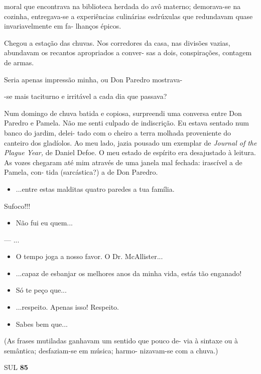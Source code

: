 moral que encontrava na biblioteca herdada do avô materno; demorava-se
na cozinha, entregava-se a experiências culinárias esdrúxulas que
redundavam quase invariavelmente em fa- lhanços épicos.

Chegou a estação das chuvas. Nos corredores da casa, nas divisões
vazias, abundavam os recantos apropriados a conver- sas a dois,
conspirações, contagem de armas.

Seria apenas impressão minha, ou Don Paredro mostrava-

-se mais taciturno e irritável a cada dia que passava?

Num domingo de chuva batida e copiosa, surpreendi uma conversa entre Don
Paredro e Pamela. Não me senti culpado de indiscrição. Eu estava sentado
num banco do jardim, delei- tado com o cheiro a terra molhada
proveniente do canteiro dos gladíolos. Ao meu lado, jazia pousado um
exemplar de \emph{Journal of the Plague Year, }de Daniel Defoe. O meu
estado de espírito era desajustado à leitura. As vozes chegaram até mim
através de uma janela mal fechada: irascível a de Pamela, con- tida
(sarcástica?) a de Don Paredro.

\begin{itemize}
\tightlist
\item
  ...entre estas malditas quatro paredes a tua família.
\end{itemize}

Sufoco!!!

\begin{itemize}
\tightlist
\item
  Não fui eu quem...
\end{itemize}

--- ...

\begin{itemize}
\tightlist
\item
  O tempo joga a nosso favor. O Dr. McAllister...
\item
  ...capaz de esbanjar os melhores anos da minha vida, estás tão
  enganado!
\item
  Só te peço que...
\item
  ...respeito. Apenas isso! Respeito.
\item
  Sabes bem que...
\end{itemize}

(As frases mutiladas ganhavam um sentido que pouco de- via à sintaxe ou
à semântica; desfaziam-se em música; harmo- nizavam-se com a chuva.)

SUL \textbf{85}

